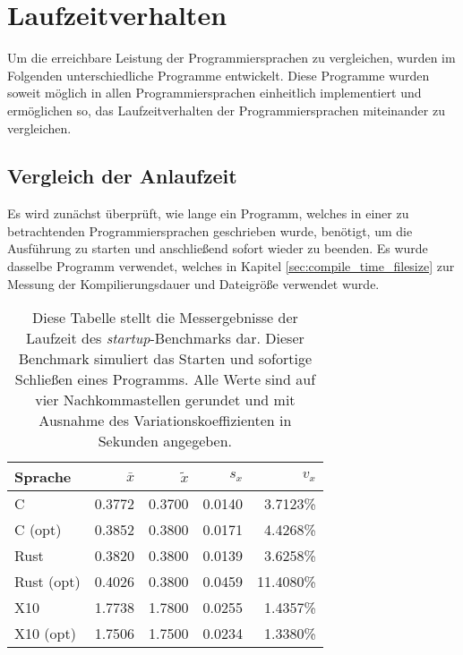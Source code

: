 \section{Laufzeitverhalten}

Um die erreichbare Leistung der Programmiersprachen zu vergleichen,
wurden im Folgenden unterschiedliche Programme entwickelt.
Diese Programme wurden soweit möglich in allen Programmiersprachen einheitlich implementiert und ermöglichen so,
das Laufzeitverhalten der Programmiersprachen miteinander zu vergleichen.

\subsection{Vergleich der Anlaufzeit}

Es wird zunächst überprüft, wie lange ein Programm,
welches in einer zu betrachtenden Programmiersprachen geschrieben wurde,
benötigt, um die Ausführung zu starten und anschließend sofort wieder zu beenden.
Es wurde dasselbe Programm verwendet, welches in Kapitel \ref{sec:compile_time_filesize} zur Messung
der Kompilierungsdauer und Dateigröße verwendet wurde.

\begin{table}[hb]
	\begin{center}
		\begin{tabular}{lrrrr}
			\toprule
			Sprache    & $\bar{x}$ & $\tilde{x}$ & $s_x$ & $v_x$ \\
			\midrule
			C          & 0.3772 & 0.3700 & 0.0140 &  3.7123\% \\
			C (opt)    & 0.3852 & 0.3800 & 0.0171 &  4.4268\% \\
			Rust       & 0.3820 & 0.3800 & 0.0139 &  3.6258\% \\
			Rust (opt) & 0.4026 & 0.3800 & 0.0459 & 11.4080\% \\
			X10        & 1.7738 & 1.7800 & 0.0255 &  1.4357\% \\
			X10 (opt)  & 1.7506 & 1.7500 & 0.0234 &  1.3380\% \\
			\bottomrule
		\end{tabular}
	\end{center}
	\caption{
		Diese Tabelle stellt die Messergebnisse der Laufzeit des \textit{startup}-Benchmarks dar.
		Dieser Benchmark simuliert das Starten und sofortige Schließen eines Programms.
		Alle Werte sind auf vier Nachkommastellen gerundet und mit Ausnahme des Variationskoeffizienten
		in Sekunden angegeben.
	}
	\label{fig:startup_table}
\end{table}

